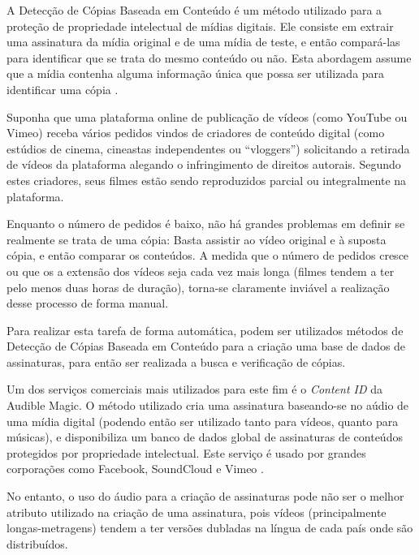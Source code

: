 A Detecção de Cópias Baseada em Conteúdo é um método utilizado para a proteção de propriedade intelectual de mídias digitais. Ele consiste em extrair uma assinatura da mídia original e de uma mídia de teste, e então compará-las para identificar que se trata do mesmo conteúdo ou não. Esta abordagem assume que a mídia contenha alguma informação única que possa ser utilizada para identificar uma cópia \citeauthor{kim2005spatiotemporal}. 

Suponha que uma plataforma online de publicação de vídeos (como YouTube ou Vimeo) receba vários pedidos vindos de criadores de conteúdo digital (como estúdios de cinema, cineastas independentes ou ``vloggers'') solicitando a retirada de vídeos da plataforma alegando o infringimento de direitos autorais. Segundo estes criadores, seus filmes estão sendo reproduzidos parcial ou integralmente na plataforma. 

Enquanto o número de pedidos é baixo, não há grandes problemas em definir se realmente se trata de uma cópia: Basta assistir ao vídeo original e à suposta cópia, e então comparar os conteúdos. A medida que o número de pedidos cresce ou que os a extensão dos vídeos seja cada vez mais longa (filmes tendem a ter pelo menos duas horas de duração), torna-se claramente inviável a realização desse processo de forma manual.


Para realizar esta tarefa de forma automática, podem ser utilizados métodos de Detecção de Cópias Baseada em Conteúdo para a criação uma base de dados de assinaturas, para então ser realizada a busca e verificação de cópias.

Um dos serviços comerciais mais utilizados para este fim é o \textit{Content ID} da Audible Magic. O método utilizado cria uma assinatura baseando-se no aúdio de uma mídia digital (podendo então ser utilizado tanto para vídeos, quanto para músicas), e disponibiliza um banco de dados global de assinaturas de conteúdos protegidos por propriedade intelectual. Este serviço é usado por grandes corporações como Facebook, SoundCloud e Vimeo \citeauthor{audiblemagic}.

No entanto, o uso do áudio para a criação de assinaturas pode não ser o melhor atributo utilizado na criação de uma assinatura, pois vídeos (principalmente longas-metragens) tendem a ter versões dubladas na língua de cada país onde são distribuídos. 

